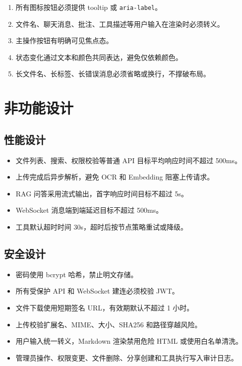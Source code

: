 \documentclass[a4paper,zihao=-4]{ctexart}
\providecommand{\tightlist}{%
  \setlength{\itemsep}{0pt}\setlength{\parskip}{0pt}}
\providecommand{\passthrough}[1]{#1}
\begin{document}
\begin{enumerate}
\def\labelenumi{\arabic{enumi}.}
\tightlist
\item
  所有图标按钮必须提供 tooltip 或 \passthrough{\lstinline!aria-label!}。
\item
  文件名、聊天消息、批注、工具描述等用户输入在渲染时必须转义。
\item
  主操作按钮有明确可见焦点态。
\item
  状态变化通过文本和颜色共同表达，避免仅依赖颜色。
\item
  长文件名、长标签、长错误消息必须省略或换行，不撑破布局。
\end{enumerate}

\hypertarget{ux975eux529fux80fdux8bbeux8ba1}{%
\section{非功能设计}\label{ux975eux529fux80fdux8bbeux8ba1}}

\hypertarget{ux6027ux80fdux8bbeux8ba1}{%
\subsection{性能设计}\label{ux6027ux80fdux8bbeux8ba1}}

\begin{itemize}
\tightlist
\item
  文件列表、搜索、权限校验等普通 API 目标平均响应时间不超过 500ms。
\item
  上传完成后异步解析，避免 OCR 和 Embedding 阻塞上传请求。
\item
  RAG 问答采用流式输出，首字响应时间目标不超过 5s。
\item
  WebSocket 消息端到端延迟目标不超过 500ms。
\item
  工具默认超时时间 30s，超时后按节点策略重试或降级。
\end{itemize}

\hypertarget{ux5b89ux5168ux8bbeux8ba1}{%
\subsection{安全设计}\label{ux5b89ux5168ux8bbeux8ba1}}

\begin{itemize}
\tightlist
\item
  密码使用 bcrypt 哈希，禁止明文存储。
\item
  所有受保护 API 和 WebSocket 建连必须校验 JWT。
\item
  文件下载使用短期签名 URL，有效期默认不超过 1 小时。
\item
  上传校验扩展名、MIME、大小、SHA256 和路径穿越风险。
\item
  用户输入统一转义，Markdown 渲染禁用危险 HTML 或使用白名单清洗。
\item
  管理员操作、权限变更、文件删除、分享创建和工具执行写入审计日志。
\end{itemize}
\end{document}
